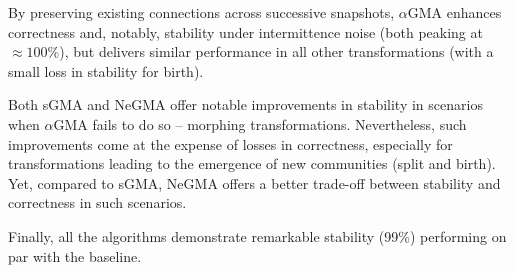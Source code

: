 \documentclass[letterpaper]{article}
\begin{document}
By preserving existing connections across successive snapshots, $\alpha$GMA enhances correctness and, notably, stability under intermittence noise (both peaking at $\approx 100\%$), but delivers similar performance in all other transformations (with a small loss in stability for birth).

Both sGMA and NeGMA offer notable improvements in stability in scenarios when $\alpha$GMA fails to do so -- \ie morphing transformations. Nevertheless, such improvements come at the expense of losses in correctness, especially for transformations leading to the emergence of new communities (\ie split and birth). Yet, compared to sGMA, NeGMA offers a better trade-off between stability and correctness in such scenarios.

Finally, all the algorithms demonstrate remarkable stability (99\%) performing on par with the baseline.
\end{document}
